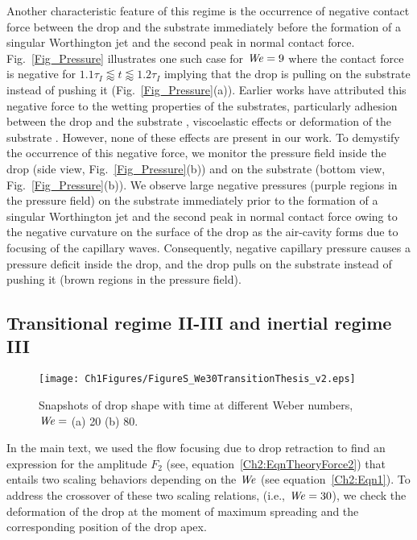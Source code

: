 \begin{subappendices}
	Another characteristic feature of this regime is the occurrence of negative contact force between the drop and the substrate immediately before the formation of a singular Worthington jet and the second peak in normal contact force. Fig.~\ref{Fig_Pressure} illustrates one such case for $\mathit{We} = 9$ where the contact force is negative for $1.1\tau_I \lessapprox t \lessapprox 1.2\tau_I$ implying that the drop is pulling on the substrate instead of pushing it (Fig.~\ref{Fig_Pressure}(a)). Earlier works \cite{grinspan2010impact, li2014, Gordillo2018} have attributed this negative force to the wetting properties of the substrates, particularly adhesion between the drop and the substrate \cite{samuel2011study, liimatainen2017mapping}, viscoelastic effects or deformation of the substrate \cite{Gordillo2018}. However, none of these effects are present in our work. To demystify the occurrence of this negative force, we monitor the pressure field inside the drop (side view, Fig.~\ref{Fig_Pressure}(b)) and on the substrate (bottom view, Fig.~\ref{Fig_Pressure}(b)). We observe large negative pressures (purple regions in the pressure field) on the substrate immediately prior to the formation of a singular Worthington jet and the second peak in normal contact force owing to the negative curvature on the surface of the drop as the air-cavity forms due to focusing of the capillary waves. Consequently, negative capillary pressure causes a pressure deficit inside the drop, and the drop pulls on the substrate instead of pushing it (brown regions in the pressure field).
	
	\subsection{Transitional regime II-III and inertial regime III}
	
	\begin{sidewaysfigure}
		\centering
		\texttt{[image: Ch1Figures/FigureS\_We30TransitionThesis\_v2.eps]}
		\caption{Snapshots of drop shape with time at different Weber numbers, $\mathit{We} = $  (a) 20 (b) 80.}
		\label{Ch2:Fig_Transition}
	\end{sidewaysfigure}
	
	In the main text, we used the flow focusing due to drop retraction to find an expression for the amplitude $F_2$ (see, equation~\eqref{Ch2:EqnTheoryForce2}) that entails two scaling behaviors depending on the $\mathit{We}$ (see equation~\eqref{Ch2:Eqn1}). To address the crossover of these two scaling relations, (i.e., $\mathit{We} = 30$), we check the deformation of the drop at the moment of maximum spreading and the corresponding position of the drop apex. 
	

\end{subappendices}
